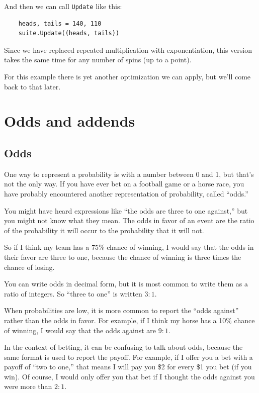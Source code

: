 \documentclass[12pt]{book}
\begin{document}
And then we can call \verb"Update" like this:

\begin{verbatim}
    heads, tails = 140, 110
    suite.Update((heads, tails))
\end{verbatim}

Since we have replaced repeated multiplication with exponentiation,
this version takes the same time for any number of spins (up
to a point).

For this example there is yet another optimization we can apply,
but we'll come back to that later.


\chapter{Odds and addends}

\section{Odds}

One way to represent a probability is with a number between
0 and 1, but that's not the only way.  If you have ever bet
on a football game or a horse race, you have probably encountered
another representation of probability, called ``odds.''

You might have heard expressions like ``the odds are
three to one against,'' but you might not know what they mean.  
The odds in favor of an event are the ratio of the probability
it will occur to the probability that it will not.

So if I think my team has a 75\% chance of winning, I would
say that the odds in their favor are three to one, because
the chance of winning is three times the chance of losing.

You can write odds in decimal form, but it is most common to
write them as a ratio of integers.  So ``three to one'' is
written $3:1$.

When probabilities are low, it is more common to report the
``odds against'' rather than the odds in favor.  For
example, if I think my horse has a 10\% chance of winning,
I would say that the odds against are $9:1$.

In the context of betting, it can be confusing to talk about
odds, because the same format is used to report the payoff.
For example, if I offer you a bet with a payoff of ``two to one,''
that means I will pay you \$2 for every \$1 you bet (if
you win).  Of course, I would only offer you that bet if
I thought the odds against you were more than $2:1$.
\end{document}
